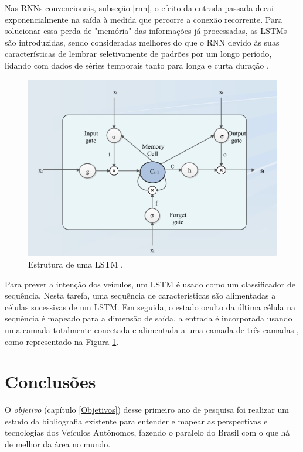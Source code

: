  \label{LSTM-s}

Nas RNNs convencionais, subseção \ref{rnn}, o efeito da entrada passada decai exponencialmente na saída à medida que percorre a conexão recorrente. Para solucionar essa perda de "memória" das informações já processadas, as LSTMs são introduzidas, sendo consideradas melhores do que o RNN devido às suas características de lembrar seletivamente de padrões por um longo período, lidando com dados de séries temporais tanto para longa e curta duração \cite{software-cnn}.

\begin{figure}[H]
\centering
\includegraphics[width=\textwidth]{Figures/LSTM.png}
\caption{Estrutura de uma LSTM \cite{software-cnn}.}
\label{LSTM}
\end{figure}

Para prever a intenção dos veículos, um LSTM é usado como um classificador de sequência. Nesta tarefa, uma sequência de características são alimentadas a células sucessivas de um LSTM. Em seguida, o estado oculto da última célula na sequência é mapeado para a dimensão de saída, a entrada é incorporada usando uma camada totalmente conectada e alimentada a uma camada de três camadas \cite{software-review}, como representado na Figura \ref{LSTM}.

\chapter{Conclusões} \label{concl}

O \textit{objetivo} (capítulo \ref{Objetivos}) desse primeiro ano de pesquisa foi realizar um estudo da bibliografia existente para entender e mapear as perspectivas e tecnologias dos Veículos Autônomos, fazendo o paralelo do Brasil com o que há de melhor da área no mundo. 

